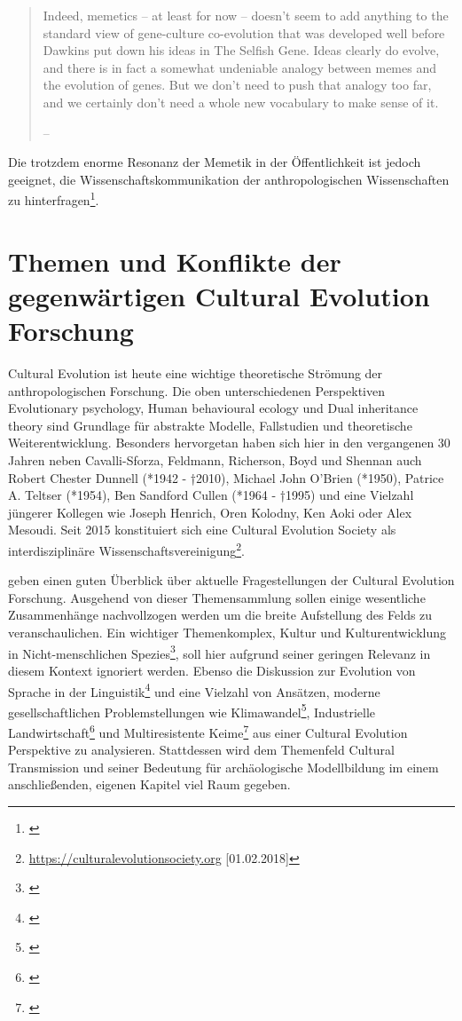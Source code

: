 \documentclass[openany,twoside,twocolumn]{book}
\let\rmarkdownfootnote\footnote%
\def\footnote{\protect\rmarkdownfootnote}
\begin{document}
\begin{quote}
Indeed, memetics -- at least for now -- doesn't seem to add anything to
the standard view of gene-culture co-evolution that was developed well
before Dawkins put down his ideas in The Selfish Gene. Ideas clearly do
evolve, and there is in fact a somewhat undeniable analogy between memes
and the evolution of genes. But we don't need to push that analogy too
far, and we certainly don't need a whole new vocabulary to make sense of
it.

-- \textcite{pigliucci_trouble_2007}
\end{quote}

Die trotzdem enorme Resonanz der Memetik in der Öffentlichkeit ist
jedoch geeignet, die Wissenschaftskommunikation der anthropologischen
Wissenschaften zu hinterfragen\footnote{\textcite{bloch_where_2005}}.

\hypertarget{themen-und-konflikte-der-gegenwartigen-cultural-evolution-forschung}{%
\section{Themen und Konflikte der gegenwärtigen Cultural Evolution
Forschung}\label{themen-und-konflikte-der-gegenwartigen-cultural-evolution-forschung}}

Cultural Evolution ist heute eine wichtige theoretische Strömung der
anthropologischen Forschung. Die oben unterschiedenen Perspektiven
Evolutionary psychology, Human behavioural ecology und Dual inheritance
theory sind Grundlage für abstrakte Modelle, Fallstudien und
theoretische Weiterentwicklung. Besonders hervorgetan haben sich hier in
den vergangenen 30 Jahren neben Cavalli-Sforza, Feldmann, Richerson,
Boyd und Shennan auch Robert Chester Dunnell (*1942 - †2010), Michael
John O'Brien (*1950), Patrice A. Teltser (*1954), Ben Sandford Cullen
(*1964 - †1995) und eine Vielzahl jüngerer Kollegen wie Joseph Henrich,
Oren Kolodny, Ken Aoki oder Alex Mesoudi. Seit 2015 konstituiert sich
eine Cultural Evolution Society als interdisziplinäre
Wissenschaftsvereinigung\footnote{\url{https://culturalevolutionsociety.org}
  {[}01.02.2018{]}}.

\textcite{creanza_cultural_2017} geben einen guten Überblick über
aktuelle Fragestellungen der Cultural Evolution Forschung. Ausgehend von
dieser Themensammlung sollen einige wesentliche Zusammenhänge
nachvollzogen werden um die breite Aufstellung des Felds zu
veranschaulichen. Ein wichtiger Themenkomplex, Kultur und
Kulturentwicklung in Nicht-menschlichen Spezies\footnote{\textcite{laland_question_2009}},
soll hier aufgrund seiner geringen Relevanz in diesem Kontext ignoriert
werden. Ebenso die Diskussion zur Evolution von Sprache in der
Linguistik\footnote{\textcite{nowak_evolution_1999}} und eine Vielzahl
von Ansätzen, moderne gesellschaftlichen Problemstellungen wie
Klimawandel\footnote{\textcite{seneviratne_allowable_2016}},
Industrielle Landwirtschaft\footnote{\textcite{garibaldi_farming_2017}}
und Multiresistente Keime\footnote{\textcite{boni_evolution_2005}} aus
einer Cultural Evolution Perspektive zu analysieren. Stattdessen wird
dem Themenfeld Cultural Transmission und seiner Bedeutung für
archäologische Modellbildung im einem anschließenden, eigenen Kapitel
viel Raum gegeben.
\end{document}
